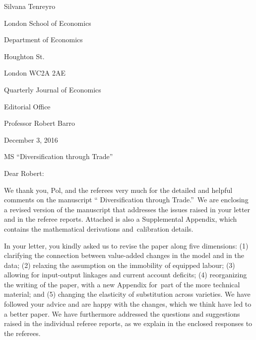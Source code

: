 \documentclass[12pt]{article}
\begin{document}
\begin{letterfromaddr}
Silvana Tenreyro

London School of Economics

Department of Economics

Houghton St.

London WC2A 2AE

\bigskip
\end{letterfromaddr}

\begin{letterto}
Quarterly Journal of Economics
\end{letterto}

\begin{lettertoaddr}
Editorial Office

Professor Robert Barro
\end{lettertoaddr}

\begin{letterdate}
December 3, 2016\bigskip
\end{letterdate}

\begin{lettersubj}
MS \textquotedblleft Diversification through Trade\textquotedblright \bigskip
\end{lettersubj}

\begin{letteropening}
Dear Robert:
\end{letteropening}

We thank you, Pol, and the referees very much for the
detailed and helpful comments on the manuscript \textquotedblleft
Diversification through Trade.\textquotedblright\ We are enclosing a revised
version of the manuscript that addresses the issues raised in your letter
and in the referee reports. Attached is also a Supplemental Appendix, which
contains the mathematical derivations and\ calibration details.

In your letter, you kindly asked us to revise the paper along five
dimensions: (1) clarifying the connection between value-added changes in the
model and in the data; (2) relaxing the assumption on the immobility of
equipped labour; (3) allowing for input-output linkages and current account
deficits; (4) reorganizing the writing of the paper, with a new Appendix
for\ part of the more technical material; and (5) changing the elasticity of
substitution across varieties. We have followed your advice and are happy
with the changes, which we think have led to a better paper. We have
furthermore addressed the questions and suggestions raised in the individual
referee reports, as we explain in the enclosed responses to the referees.
\end{document}
